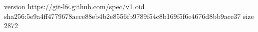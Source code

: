 version https://git-lfs.github.com/spec/v1
oid sha256:5e9a4ff4779678aece88eb4b2e8556fb9789f54c8b169f5f6e4676d8bb9ace37
size 2872
